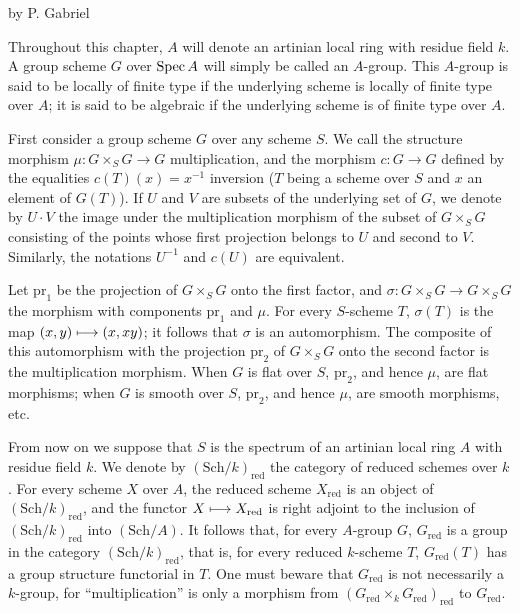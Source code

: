 \label{VIA}
\begin{center}by P. Gabriel\end{center}
Throughout this chapter, $A$ will denote an artinian local ring with residue field $k$. A group scheme $G$ over $\operatorname{Spec} A$ will simply be called an $A$-group. This $A$-group is said to be locally of finite type if the underlying scheme is locally of finite type over $A$; it is said to be algebraic if the underlying scheme is of finite type over $A$.

First consider a group scheme $G$ over any scheme $S$. We call the structure morphism $\mu:G\times_SG\to G$ multiplication, and the morphism $c:G\to G$ defined by the equalities $c(T)(x)=x^{-1}$ inversion ($T$ being a scheme over $S$ and $x$ an element of $G(T)$). If $U$ and $V$ are subsets of the underlying set of $G$, we denote by $U\cdot V$ the image under the multiplication morphism of the subset of $G\times_SG$ consisting of the points whose first projection belongs to $U$ and second to $V$. Similarly, the notations $U^{-1}$ and $c(U)$ are equivalent.

Let $\mathrm{pr}_1$ be the projection of $G\times_SG$ onto the first factor, and $\sigma:G\times_SG\to G\times_SG$ the morphism with components $\mathrm{pr}_1$ and $\mu$. For every $S$-scheme $T$, $\sigma(T)$ is the map $(x,y)\longmapsto(x,xy)$; it follows that $\sigma$ is an automorphism. The composite of this automorphism with the projection $\mathrm{pr}_2$ of $G\times_SG$ onto the second factor is the multiplication morphism. When $G$ is flat over $S$, $\mathrm{pr}_2$, and hence $\mu$, are flat morphisms; when $G$ is smooth over $S$, $\mathrm{pr}_2$, and hence $\mu$, are smooth morphisms, etc.

From now on we suppose that $S$ is the spectrum of an artinian local ring $A$ with residue field $k$. We denote by $(\mathrm{Sch}/k)_{\mathrm{red}}$ the category of reduced schemes over $k$. For every scheme $X$ over $A$, the reduced scheme $X_{\mathrm{red}}$ is an object of $(\mathrm{Sch}/k)_{\mathrm{red}}$, and the functor $X\longmapsto X_{\mathrm{red}}$ is right adjoint to the inclusion of $(\mathrm{Sch}/k)_{\mathrm{red}}$ into $(\mathrm{Sch}/A)$. It follows that, for every $A$-group $G$, $G_{\mathrm{red}}$ is a group in the category $(\mathrm{Sch}/k)_{\mathrm{red}}$, that is, for every reduced $k$-scheme $T$, $G_{\mathrm{red}}(T)$ has a group structure functorial in $T$. One must beware that $G_{\mathrm{red}}$ is not necessarily a $k$-group, for ``multiplication'' is only a morphism from $(G_{\mathrm{red}}\times_kG_{\mathrm{red}})_{\mathrm{red}}$ to $G_{\mathrm{red}}$.

